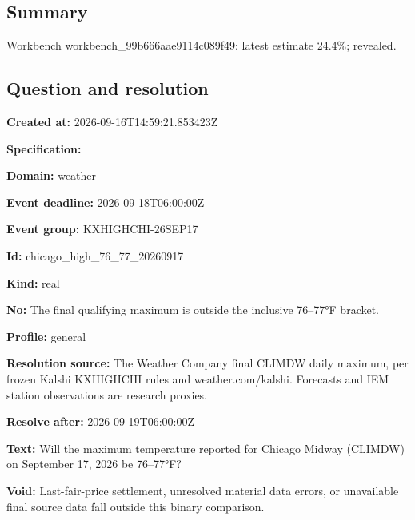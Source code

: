 \documentclass[11pt]{article}
\begin{document}
\subsection*{\textcolor{epdarkgreen}{Summary}}
Workbench workbench\_99\hspace{0pt}b666aae9114c\hspace{0pt}089f49: latest estimate 24.4\%; revealed.


\subsection*{\textcolor{epdarkgreen}{Question and resolution}}
\par\noindent\textbf{Created at:} 2026-09-16T14:59:21.853423Z

\par\noindent\textbf{Specification:} \par \par\noindent\textbf{Domain:} weather

\par\noindent\textbf{Event deadline:} 2026-09-18T06:00:00Z

\par\noindent\textbf{Event group:} KXHIGHCHI-26SEP17

\par\noindent\textbf{Id:} chicago\_high\_76\_77\_20260917

\par\noindent\textbf{Kind:} real

\par\noindent\textbf{No:} The final qualifying maximum is outside the inclusive 76–77°F bracket.

\par\noindent\textbf{Profile:} general

\par\noindent\textbf{Resolution source:} The Weather Company final CLIMDW daily maximum, per frozen Kalshi KXHIGHCHI rules and weather.com/kalshi. Forecasts and IEM station observations are research proxies.

\par\noindent\textbf{Resolve after:} 2026-09-19T06:00:00Z

\par\noindent\textbf{Text:} Will the maximum temperature reported for Chicago Midway (CLIMDW) on September 17, 2026 be 76–77°F?

\par\noindent\textbf{Void:} Last-fair-price settlement, unresolved material data errors, or unavailable final source data fall outside this binary comparison.
\end{document}
